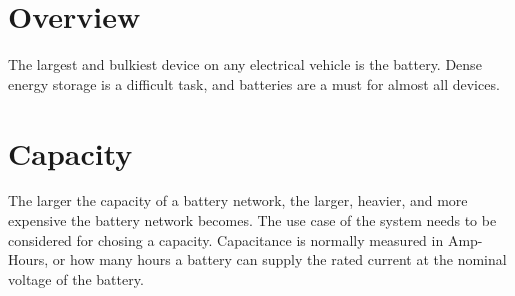 \documentclass{article}
\begin{document}
\section{Overview}
The largest and bulkiest device on any electrical vehicle is the battery.
Dense energy storage is a difficult task, and batteries are a must for almost all devices.
\section{Capacity}
The larger the capacity of a battery network, the larger, heavier, and more expensive the battery network becomes.
The use case of the system needs to be considered for chosing a capacity.
Capacitance is normally measured in Amp-Hours, or how many hours a battery can supply the rated current at the nominal voltage of the battery.
\end{document}
